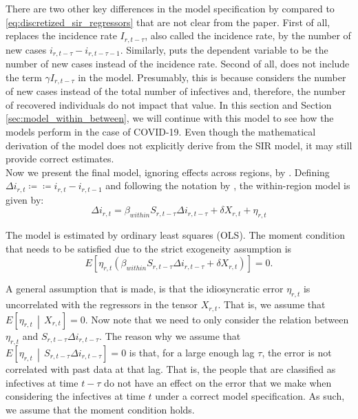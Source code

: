 \documentclass[12pt]{article}
\begin{document}
	There are two other key differences in the model specification by \textcite{adda2016economic} compared to \eqref{eq:discretized_sir_regressors} that are not clear from the paper. First of all, \textcite{adda2016economic} replaces the incidence rate $I_{r,t-\tau}$, also called the incidence rate, by the number of new cases $i_{r,t-\tau} - i_{r,t-\tau-1}$. Similarly, \textcite{adda2016economic} puts the dependent variable to be the number of new cases instead of the incidence rate. Second of all, \textcite{adda2016economic} does not include the term $\gamma I_{r,t-\tau}$ in the model. Presumably, this is because \textcite{adda2016economic} considers the number of new cases instead of the total number of infectives and, therefore, the number of recovered individuals do not impact that value. In this section and Section \ref{sec:model_within_between}, we will continue with this model to see how the models perform in the case of COVID-19. Even though the mathematical derivation of the model does not explicitly derive from the SIR model, it may still provide correct estimates. \\
	
	Now we present the final model, ignoring effects across regions, by \textcite{adda2016economic}. Defining $\Delta i_{r,t} \coloneqq  \coloneqq i_{r,t} - i_{r,t-1}$ and following the notation by \textcite{keeling2011modeling}, the within-region model is given by:
	\begin{equation} \label{eq:model_within}
	    \Delta i_{r,t} = \beta_{within}S_{r,t-\tau}\Delta i_{r,t-\tau} + \delta X_{r,t} + \eta_{r,t}
	\end{equation}
	
	The model is estimated by ordinary least squares (OLS). The moment condition that needs to be satisfied due to the strict exogeneity assumption is
	    \[E\left[ \eta_{r,t} \left( \beta_{within}S_{r,t-\tau}\Delta i_{r,t-\tau} + \delta X_{r,t} \right) \right] = 0.\]
	
	A general assumption that is made, is that the idiosyncratic error $\eta_{r,t}$ is uncorrelated with the regressors in the tensor $X_{r,t}$. That is, we assume that $E\left[\eta_{r,t} \,\middle|\, X_{r,t}\right] = 0$. Now note that we need to only consider the relation between $\eta_{r,t}$ and $S_{r,t-\tau}\Delta i_{r,t-\tau}$. The reason why we assume that $E\left[\eta_{r,t} \,\middle|\, S_{r,t-\tau}\Delta i_{r,t-\tau}\right] = 0$ is that, for a large enough lag $\tau$, the error is not correlated with past data at that lag. That is, the people that are classified as infectives at time $t-\tau$ do not have an effect on the error that we make when considering the infectives at time $t$ under a correct model specification. As such, we assume that the moment condition holds.
	
\end{document}
